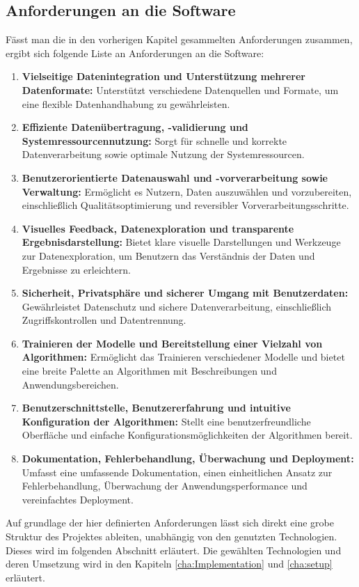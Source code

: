 \subsection{Anforderungen an die Software}
Fässt man die in den vorherigen Kapitel gesammelten Anforderungen zusammen, ergibt sich folgende Liste an Anforderungen an die Software:
\begin{enumerate}
    \item \textbf{Vielseitige Datenintegration und Unterstützung mehrerer Datenformate:} Unterstützt verschiedene Datenquellen und Formate, um eine flexible Datenhandhabung zu gewährleisten.
    \item \textbf{Effiziente Datenübertragung, -validierung und Systemressourcennutzung:} Sorgt für schnelle und korrekte Datenverarbeitung sowie optimale Nutzung der Systemressourcen.
    \item \textbf{Benutzerorientierte Datenauswahl und -vorverarbeitung sowie Verwaltung:} Ermöglicht es Nutzern, Daten auszuwählen und vorzubereiten, einschließlich Qualitätsoptimierung und reversibler Vorverarbeitungsschritte.
    \item \textbf{Visuelles Feedback, Datenexploration und transparente Ergebnisdarstellung:} Bietet klare visuelle Darstellungen und Werkzeuge zur Datenexploration, um Benutzern das Verständnis der Daten und Ergebnisse zu erleichtern.
    \item \textbf{Sicherheit, Privatsphäre und sicherer Umgang mit Benutzerdaten:} Gewährleistet Datenschutz und sichere Datenverarbeitung, einschließlich Zugriffskontrollen und Datentrennung.
    \item \textbf{Trainieren der Modelle und Bereitstellung einer Vielzahl von Algorithmen:} Ermöglicht das Trainieren verschiedener Modelle und bietet eine breite Palette an Algorithmen mit Beschreibungen und Anwendungsbereichen.
    \item \textbf{Benutzerschnittstelle, Benutzererfahrung und intuitive Konfiguration der Algorithmen:} Stellt eine benutzerfreundliche Oberfläche und einfache Konfigurationsmöglichkeiten der Algorithmen bereit.
    \item \textbf{Dokumentation, Fehlerbehandlung, Überwachung und Deployment:} Umfasst eine umfassende Dokumentation, einen einheitlichen Ansatz zur Fehlerbehandlung, Überwachung der Anwendungsperformance und vereinfachtes Deployment.
\label{list:requirements}
\end{enumerate}

Auf grundlage der hier definierten Anforderungen lässt sich direkt eine grobe Struktur des Projektes ableiten, unabhängig von den genutzten Technologien. Dieses wird im folgenden Abschnitt erläutert.
Die gewählten Technologien und deren Umsetzung wird in den Kapiteln \ref{cha:Implementation} und \ref{cha:setup} erläutert.





